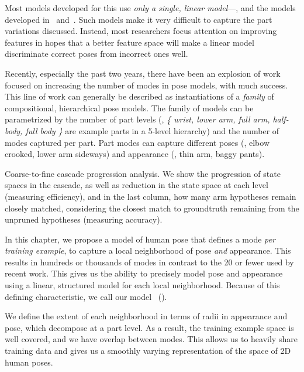 Most models developed for this use {\em only a single, linear model}---\eg, 
\citet{devacrf,eichner09,andriluka09,ddtran} and the models developed 
in~ and~.
Such models make it very difficult to capture the part variations discussed.  
Instead, most researchers focus attention on improving features in hopes that a 
better feature space will make a linear model discriminate correct poses from 
incorrect ones well.  

Recently, especially the past two years, there have been an explosion of work 
focused on increasing the number of modes in pose models, with much success.  
This line of work can generally be described as instantiations of a {\em family 
} of compositional, hierarchical pose models.  The family of models can be 
parametrized by the number of part levels (\eg, {\em \{ wrist, lower arm, full 
arm, half-body, full body \}} are example parts in a 5-level hierarchy) and the 
number of modes captured per part.  Part modes can capture different poses 
(\eg, elbow crooked, lower arm sideways) and appearance (\eg, thin arm, baggy 
pants).


 \begin{table}[tb]
\begin{center}
{\tiny

}
\caption[Coarse-to-fine cascade progression analysis.]{Coarse-to-fine cascade 
progression analysis. We show the progression of state spaces in the cascade, 
as well as reduction in the state space at each level (measuring efficiency), 
and in the last column, how many arm hypotheses remain closely matched, 
considering the closest match to groundtruth remaining from the unpruned 
hypotheses (measuring accuracy). }
\label{tab:rel-work-ps} \end{center}
\end{table}



 In this chapter, we propose a model of human pose that 
defines a mode {\em per training example}, to capture a local neighborhood of
pose {\em and } appearance.  This results in hundreds or thousands of modes in 
contrast to the 20 or fewer used by recent work. This gives us the ability to 
precisely model pose and appearance using a linear, structured model for each 
local neighborhood.  Because of this defining characteristic, we call our model 
\LLPSlong~(\LLPS).

We define the extent of each neighborhood in terms of radii in appearance and 
pose, which decompose at a part level.  As a result, the training example space 
is well covered, and we have overlap between modes.  This allows us to heavily 
share training data and gives us a smoothly varying representation of the space 
of 2D human poses.

